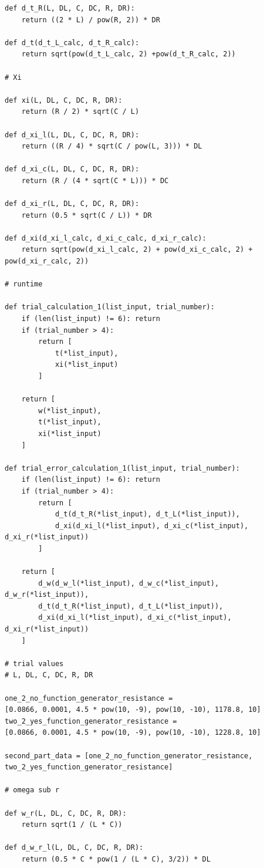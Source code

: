 \documentclass[12pt]{article}
\begin{document}
\begin{verbatim}
def d_t_R(L, DL, C, DC, R, DR):
    return ((2 * L) / pow(R, 2)) * DR

def d_t(d_t_L_calc, d_t_R_calc):
    return sqrt(pow(d_t_L_calc, 2) +pow(d_t_R_calc, 2))

# Xi

def xi(L, DL, C, DC, R, DR):
    return (R / 2) * sqrt(C / L)

def d_xi_l(L, DL, C, DC, R, DR):
    return ((R / 4) * sqrt(C / pow(L, 3))) * DL

def d_xi_c(L, DL, C, DC, R, DR):
    return (R / (4 * sqrt(C * L))) * DC

def d_xi_r(L, DL, C, DC, R, DR):
    return (0.5 * sqrt(C / L)) * DR

def d_xi(d_xi_l_calc, d_xi_c_calc, d_xi_r_calc):
    return sqrt(pow(d_xi_l_calc, 2) + pow(d_xi_c_calc, 2) + pow(d_xi_r_calc, 2))

# runtime

def trial_calculation_1(list_input, trial_number):
    if (len(list_input) != 6): return
    if (trial_number > 4):
        return [
            t(*list_input),
            xi(*list_input)
        ]
    
    return [
        w(*list_input),
        t(*list_input),
        xi(*list_input)
    ]

def trial_error_calculation_1(list_input, trial_number):
    if (len(list_input) != 6): return
    if (trial_number > 4):
        return [
            d_t(d_t_R(*list_input), d_t_L(*list_input)),
            d_xi(d_xi_l(*list_input), d_xi_c(*list_input), d_xi_r(*list_input))
        ]
    
    return [
        d_w(d_w_l(*list_input), d_w_c(*list_input), d_w_r(*list_input)),
        d_t(d_t_R(*list_input), d_t_L(*list_input)),
        d_xi(d_xi_l(*list_input), d_xi_c(*list_input), d_xi_r(*list_input))
    ]

# trial values
# L, DL, C, DC, R, DR

one_2_no_function_generator_resistance = 
[0.0866, 0.0001, 4.5 * pow(10, -9), pow(10, -10), 1178.8, 10]
two_2_yes_function_generator_resistance = 
[0.0866, 0.0001, 4.5 * pow(10, -9), pow(10, -10), 1228.8, 10]

second_part_data = [one_2_no_function_generator_resistance,
two_2_yes_function_generator_resistance]

# omega sub r

def w_r(L, DL, C, DC, R, DR):
    return sqrt(1 / (L * C))

def d_w_r_l(L, DL, C, DC, R, DR):
    return (0.5 * C * pow(1 / (L * C), 3/2)) * DL


\end{verbatim}
\end{document}
